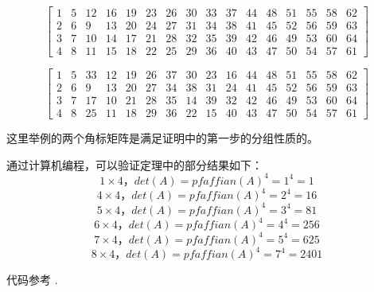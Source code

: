 \documentclass{amsc}          %
\numberwithin{equation}{section} %
\begin{document}
$$\left[\begin{array}{cccccccccccccccccc}
1 & 5 & 12 & 16 & 19 & 23 & 26 & 30 & 33 & 37 & 44 & 48 & 51 & 55 & 58 & 62\\
2 & 6 & 9 & 13 & 20 & 24 & 27 & 31 & 34 & 38 & 41 & 45 & 52 & 56 & 59 & 63\\
3 & 7 & 10 & 14 & 17 & 21 & 28 & 32 & 35 & 39 & 42 & 46 & 49 & 53 & 60 & 64\\
4 & 8 & 11 & 15 & 18 & 22 & 25 & 29 & 36 & 40 & 43 & 47 & 50 & 54 & 57 & 61
\end{array}\right]$$

$$\left[\begin{array}{cccccccccccccccccc}
1&5&33&12&19&26&37&30&23&16&44&48&51&55&58&62\\
2&6&9&13&20&27&34&38&31&24&41&45&52&56&59&63\\
3&7&17&10&21&28&35&14&39&32&42&46&49&53&60&64\\
4&8&25&11&18&29&36&22&15&40&43&47&50&54&57&61
\end{array}\right]$$

这里举例的两个角标矩阵是满足证明中的第一步的分组性质的。

通过计算机编程，可以验证定理中的部分结果如下：
$$1 \times4，det(A) = pfaffian(A)^{4} = 1^{4}=1$$
$$4 \times4，det(A) = pfaffian(A)^{4} = 2^{4}=16$$
$$5 \times4，det(A) = pfaffian(A)^{4} = 3^{4}=81$$
$$6 \times4，det(A) = pfaffian(A)^{4} = 4^{4}=256$$
$$7 \times4，det(A) = pfaffian(A)^{4} = 5^{4}=625$$
$$8 \times4，det(A) = pfaffian(A)^{4} = 7^{4}=2401$$

代码参考 \cite{IM}.
\end{document}
